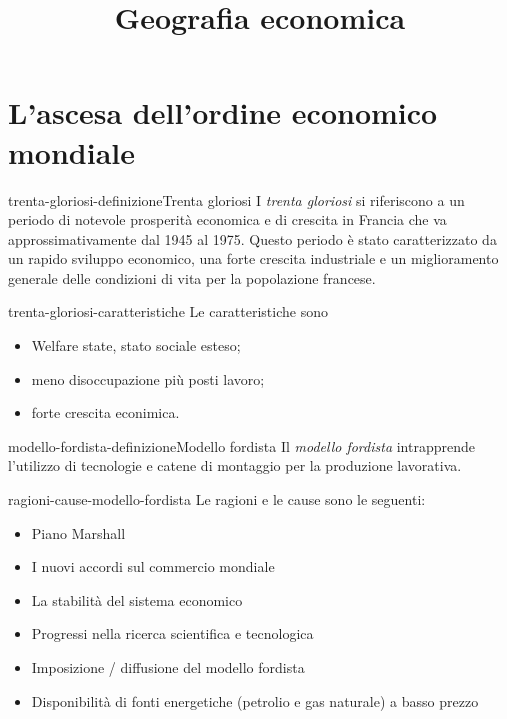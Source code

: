 \documentclass[preview]{standalone}
\begin{document}
\title{Geografia economica}
\genpage

\section{L'ascesa dell'ordine economico mondiale}

\begin{snippetdefinition}{trenta-gloriosi-definizione}{Trenta gloriosi}
    I \textit{trenta gloriosi} si riferiscono a un periodo di notevole prosperità economica e di crescita in Francia
    che va approssimativamente dal 1945 al 1975. Questo periodo è stato caratterizzato da un rapido
    sviluppo economico, una forte crescita industriale e un miglioramento generale delle condizioni di
    vita per la popolazione francese.
\end{snippetdefinition}

\begin{snippet}{trenta-gloriosi-caratteristiche}
    Le caratteristiche sono
    \begin{itemize}
        \item Welfare state, stato sociale esteso;
        \item meno disoccupazione più posti lavoro;
        \item forte crescita econimica.
    \end{itemize}
\end{snippet}

\begin{snippetdefinition}{modello-fordista-definizione}{Modello fordista}
    Il \textit{modello fordista} intrapprende l'utilizzo di tecnologie e catene di montaggio
    per la produzione lavorativa.
\end{snippetdefinition}

\begin{snippet}{ragioni-cause-modello-fordista}
    Le ragioni e le cause sono le seguenti:
    \begin{itemize}
        \item Piano Marshall
        \item I nuovi accordi sul commercio mondiale
        \item La stabilità del sistema economico
        \item Progressi nella ricerca scientifica e tecnologica
        \item Imposizione / diffusione del modello fordista
        \item Disponibilità di fonti energetiche (petrolio e gas naturale) a basso prezzo
    \end{itemize}
\end{snippet}
\end{document}
